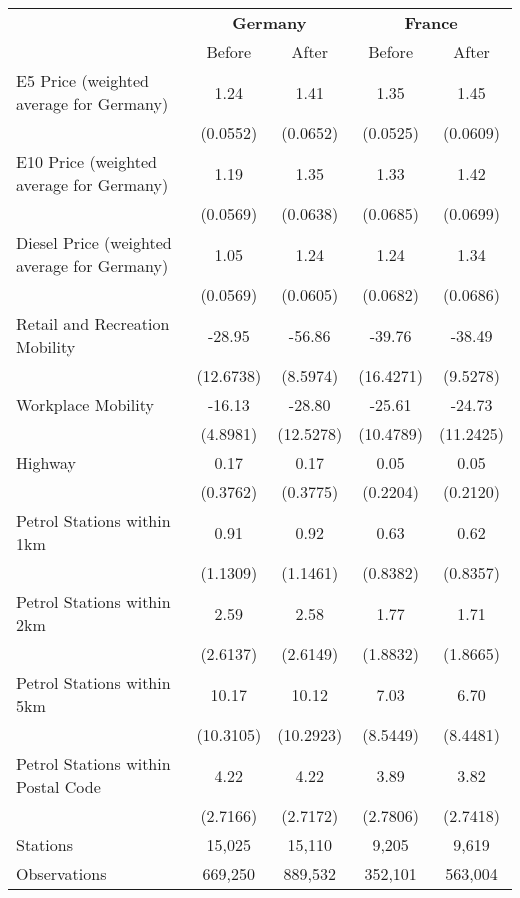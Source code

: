 \begin{tabular}{l*{4}{c}}
\toprule
                    &\multicolumn{2}{c}{\textbf{Germany}}&\multicolumn{2}{c}{\textbf{France}}\\\cmidrule(lr){2-3}\cmidrule(lr){4-5}
                    &\multicolumn{1}{c}{Before}&\multicolumn{1}{c}{After}&\multicolumn{1}{c}{Before}&\multicolumn{1}{c}{After}\\
\midrule
E5 Price (weighted average for Germany)&        1.24&        1.41&        1.35&        1.45\\
                    &    (0.0552)&    (0.0652)&    (0.0525)&    (0.0609)\\
E10 Price (weighted average for Germany)&        1.19&        1.35&        1.33&        1.42\\
                    &    (0.0569)&    (0.0638)&    (0.0685)&    (0.0699)\\
Diesel Price (weighted average for Germany)&        1.05&        1.24&        1.24&        1.34\\
                    &    (0.0569)&    (0.0605)&    (0.0682)&    (0.0686)\\
Retail and Recreation Mobility&      -28.95&      -56.86&      -39.76&      -38.49\\
                    &   (12.6738)&    (8.5974)&   (16.4271)&    (9.5278)\\
Workplace Mobility  &      -16.13&      -28.80&      -25.61&      -24.73\\
                    &    (4.8981)&   (12.5278)&   (10.4789)&   (11.2425)\\
Highway             &        0.17&        0.17&        0.05&        0.05\\
                    &    (0.3762)&    (0.3775)&    (0.2204)&    (0.2120)\\
Petrol Stations within 1km&        0.91&        0.92&        0.63&        0.62\\
                    &    (1.1309)&    (1.1461)&    (0.8382)&    (0.8357)\\
Petrol Stations within 2km&        2.59&        2.58&        1.77&        1.71\\
                    &    (2.6137)&    (2.6149)&    (1.8832)&    (1.8665)\\
Petrol Stations within 5km&       10.17&       10.12&        7.03&        6.70\\
                    &   (10.3105)&   (10.2923)&    (8.5449)&    (8.4481)\\
Petrol Stations within Postal Code&        4.22&        4.22&        3.89&        3.82\\
                    &    (2.7166)&    (2.7172)&    (2.7806)&    (2.7418)\\
\midrule
Stations            &      15,025&      15,110&       9,205&       9,619\\
Observations        &     669,250&     889,532&     352,101&     563,004\\
\bottomrule
\end{tabular}

